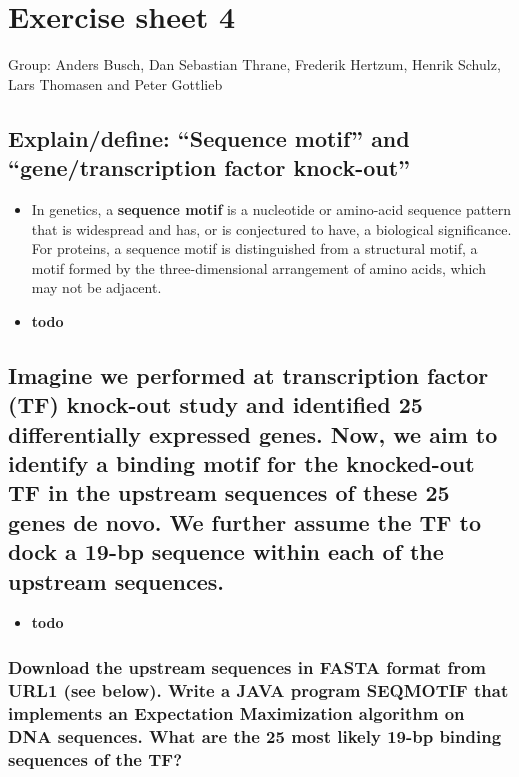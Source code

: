 \documentclass[a4paper,10pt,titlepage]{article}
\begin{document}
\section*{Exercise sheet 4}

Group: Anders Busch, Dan Sebastian Thrane, Frederik Hertzum, Henrik Schulz, Lars Thomasen and Peter Gottlieb

\subsection*{Explain/define: “Sequence motif” and “gene/transcription factor knock-out”}

\begin{itemize}
\item
In genetics, a \textbf{sequence motif} is a nucleotide or amino-acid sequence pattern that is widespread and has, or is conjectured to have, a biological significance. For proteins, a sequence motif is distinguished from a structural motif, a motif formed by the three-dimensional arrangement of amino acids, which may not be adjacent.
\item
\textbf{todo}
\end{itemize}

\subsection*{Imagine we performed at transcription factor (TF) knock-out study and identified 25 differentially expressed genes. Now, we aim to identify a binding motif for the knocked-out TF in the upstream sequences of these 25 genes de novo. We further assume the TF to dock a 19-bp sequence within each of the upstream sequences. }

\begin{itemize}
\item
\textbf{todo}
\end{itemize}

\subsubsection{Download the upstream sequences in FASTA format from URL1 (see below). Write a JAVA program SEQMOTIF that implements an Expectation Maximization algorithm on DNA sequences. What are the 25 most likely 19-bp binding sequences of the TF?}
\end{document}
